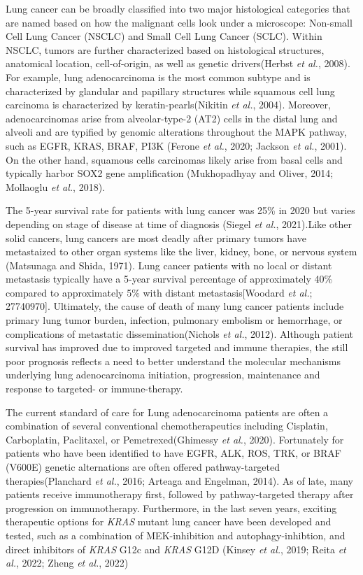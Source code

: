 Lung cancer can be broadly classified into two major histological categories that are named based on how the malignant cells look under a microscope: Non-small Cell Lung Cancer (NSCLC) and Small Cell Lung Cancer (SCLC). Within NSCLC, tumors are further characterized based on histological structures, anatomical location, cell-of-origin, as well as genetic drivers(Herbst \emph{et al.}, 2008). For example, lung adenocarcinoma is the most common subtype and is characterized by glandular and papillary structures while squamous cell lung carcinoma is characterized by keratin-pearls(Nikitin \emph{et al.}, 2004). Moreover, adenocarcinomas arise from alveolar-type-2 (AT2) cells in the distal lung and alveoli and are typified by genomic alterations throughout the MAPK pathway, such as EGFR, KRAS, BRAF, PI3K (Ferone \emph{et al.}, 2020; Jackson \emph{et al.}, 2001). On the other hand, squamous cells carcinomas likely arise from basal cells and typically harbor SOX2 gene amplification (Mukhopadhyay and Oliver, 2014; Mollaoglu \emph{et al.}, 2018).

The 5-year survival rate for patients with lung cancer was 25\% in 2020 but varies depending on stage of disease at time of diagnosis (Siegel \emph{et al.}, 2021).Like other solid cancers, lung cancers are most deadly after primary tumors have metastaized to other organ systems like the liver, kidney, bone, or nervous system (Matsunaga and Shida, 1971). Lung cancer patients with no local or distant metastasis typically have a 5-year survival percentage of approximately 40\% compared to approximately 5\% with distant metastasis{[}Woodard \emph{et al.}; 27740970{]}. Ultimately, the cause of death of many lung cancer patients include primary lung tumor burden, infection, pulmonary embolism or hemorrhage, or complications of metastatic dissemination(Nichols \emph{et al.}, 2012). Although patient survival has improved due to improved targeted and immune therapies, the still poor prognosis reflects a need to better understand the molecular mechanisms underlying lung adenocarcinoma initiation, progression, maintenance and response to targeted- or immune-therapy.

The current standard of care for Lung adenocarcinoma patients are often a combination of several conventional chemotherapeutics including Cisplatin, Carboplatin, Paclitaxel, or Pemetrexed(Ghimessy \emph{et al.}, 2020). Fortunately for patients who have been identified to have EGFR, ALK, ROS, TRK, or BRAF (V600E) genetic alternations are often offered pathway-targeted therapies(Planchard \emph{et al.}, 2016; Arteaga and Engelman, 2014). As of late, many patients receive immunotherapy first, followed by pathway-targeted therapy after progression on immunotherapy. Furthermore, in the last seven years, exciting therapeutic options for \emph{KRAS} mutant lung cancer have been developed and tested, such as a combination of MEK-inhibition and autophagy-inhibtion, and direct inhibitors of \emph{KRAS} G12c and \emph{KRAS} G12D (Kinsey \emph{et al.}, 2019; Reita \emph{et al.}, 2022; Zheng \emph{et al.}, 2022)

